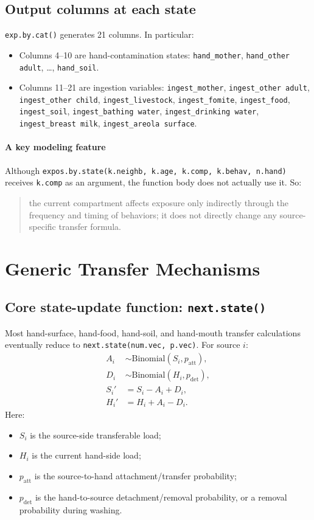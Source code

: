 \documentclass[11pt]{article}
\begin{document}
\subsection{Output columns at each state}
\texttt{exp.by.cat()} generates 21 columns. In particular:
\begin{itemize}[leftmargin=2em]
  \item Columns 4--10 are hand-contamination states: \texttt{hand\_mother}, \texttt{hand\_other adult}, \dots, \texttt{hand\_soil}.
  \item Columns 11--21 are ingestion variables: \texttt{ingest\_mother}, \texttt{ingest\_other adult}, \texttt{ingest\_other child}, \texttt{ingest\_livestock}, \texttt{ingest\_fomite}, \texttt{ingest\_food}, \texttt{ingest\_soil}, \texttt{ingest\_bathing water}, \texttt{ingest\_drinking water}, \texttt{ingest\_breast milk}, \texttt{ingest\_areola surface}.
\end{itemize}

\paragraph{A key modeling feature}
Although \texttt{expos.by.state(k.neighb, k.age, k.comp, k.behav, n.hand)} receives \texttt{k.comp} as an argument, the function body does not actually use it. So:
\begin{quote}
the current compartment affects exposure only indirectly through the frequency and timing of behaviors; it does not directly change any source-specific transfer formula.
\end{quote}

\section{Generic Transfer Mechanisms}
\subsection{Core state-update function: \texttt{next.state()}}
Most hand-surface, hand-food, hand-soil, and hand-mouth transfer calculations eventually reduce to \texttt{next.state(num.vec, p.vec)}. For source \(i\):
\begin{align*}
A_i &\sim \text{Binomial}(S_i, p_{\text{att}}), \\
D_i &\sim \text{Binomial}(H_i, p_{\text{det}}), \\
S_i' &= S_i - A_i + D_i, \\
H_i' &= H_i + A_i - D_i.
\end{align*}
Here:
\begin{itemize}[leftmargin=2em]
  \item \(S_i\) is the source-side transferable load;
  \item \(H_i\) is the current hand-side load;
  \item \(p_{\text{att}}\) is the source-to-hand attachment/transfer probability;
  \item \(p_{\text{det}}\) is the hand-to-source detachment/removal probability, or a removal probability during washing.
\end{itemize}
\end{document}

